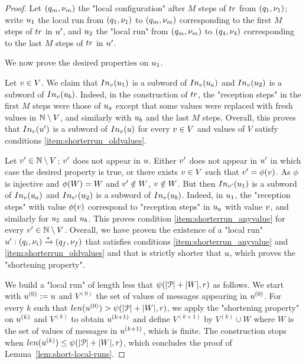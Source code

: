 \begin{proof}
	Let $(q_m, \nu_m)$ the "local configuration" after $M$ steps of $\atrace$ from $(q_1, \nu_1)$; write $u_1$ the local run from $(q_1,\nu_1)$ to $(q_m, \nu_m)$ corresponding to the first $M$ steps of $\atrace$ in $u'$, and $u_2$ the "local run" from $(q_m, \nu_m)$ to $(q_4, \nu_4)$ corresponding to the last $M$ steps of $\atrace$ in $u'$.  
	
	We now prove the desired properties on $u_{1}$.
	
	Let $v \in V$. We claim that $\vinput{\aval}{\localrun_{1}}$ is a subword of $\vinput{\aval}{\localrun_a}$ and $\vinput{\aval}{\localrun_{2}}$ is a subword of $\vinput{\aval}{\localrun_b}$. Indeed, in the construction of $\atrace$, the "reception steps" in the first $M$ steps were those of $u_a$ except that some values were replaced with fresh values in $\mathbb{N} \setminus V$, and similarly with $u_b$ and the last $M$ steps. Overall, this proves that $\vinput{\aval}{\localrun'}$ is a subword of $\vinput{\aval}{\localrun}$ for every $v \in V$ and values of $V$ satisfy conditions \ref{item:shorterrun_oldvalues}. 
	
	Let $v' \in \mathbb{N} \setminus V$; $v'$ does not appear in $u$. Either $v'$ does not appear in $u'$ in which case the desired property is true, or there exists $v \in V$ such that $v' = \phi(v)$. As $\phi$ is injective and $\phi(W) = W$ and $v'\notin W$, $v \notin W$. 
	But then $\vinput{\aval'}{\localrun_{1}}$ is a subword of $\vinput{\aval}{\localrun_a}$ and $\vinput{\aval'}{\localrun_{2}}$ is a subword of $\vinput{\aval}{\localrun_b}$. Indeed, in $u_1$, the "reception steps" with value $\phi(v)$ correspond to "reception steps" in $u_a$ with value $v$, and similarly for $u_2$ and $u_b$. This proves condition \ref{item:shorterrun_anyvalue} for every $v' \in \mathbb{N} \setminus V$.
	Overall, we have proven the existence of a "local run" $u': (q_i,\nu_i) \xrightarrow{*} (q_f,\nu_f)$ that satisfies conditions \ref{item:shorterrun_anyvalue} and \ref{item:shorterrun_oldvalues} and that is strictly shorter that $u$, which proves the "shortening property".
	
	We build a "local run" of length less that $\psi(|\mathcal{P}|+|W|,r)$ as follows. We start with $u^{(0)} := u$ and $V^{(0)}$ the set of values of messages appearing in $u^{(0)}$. For every $k$ such that $\length{\localrun^{(0)}} > \towerfun(\size{\prot}+\size{\Vinit},\regnum)$, we apply the "shortening property" on $u^{(k)}$ and $V^{(k)}$ to obtain $u^{(k+1)}$ and define $V^{(k+1)}$ by $V^{(k)} \cup W$ where $W$ is the set of values of messages in $u^{(k+1)}$, which is finite.
	The construction stops when $\length{\localrun^{(k)}} \leq \towerfun(\size{\prot} + \size{\Vinit},\regnum)$, which concludes the proof of Lemma~\ref{lem:short-local-runs}. 
\end{proof}

